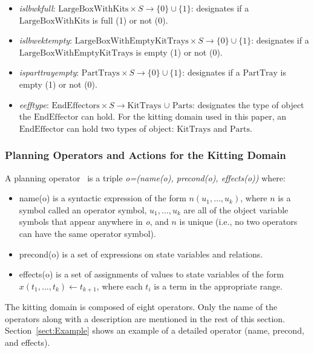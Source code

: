 \documentclass[a4paper, 10pt, conference]{ieeeconf}      %
\begin{document}
\begin{itemize}
\item \emph{islbwkfull}: $\mathrm{LargeBoxWithKits}\times S\rightarrow \lbrace 0\rbrace \cup \lbrace 1\rbrace$: designates if a $\mathrm{LargeBoxWithKits}$ is full (1) or not (0).

\item \emph{islbwektempty}: $\mathrm{LargeBoxWithEmptyKitTrays}\times S\rightarrow \lbrace 0\rbrace \cup \lbrace 1\rbrace$: designates if a $\mathrm{LargeBoxWithEmptyKitTrays}$ is empty (1) or not (0).

\item \emph{isparttrayempty}: $\mathrm{PartTrays}\times S\rightarrow \lbrace 0\rbrace \cup \lbrace 1\rbrace$: designates if a $\mathrm{PartTray}$ is empty (1) or not (0).

\item \emph{eefftype}: $\mathrm{EndEffectors}\times S \rightarrow\mathrm{KitTrays}$ $\cup$ $\mathrm{Parts}$: designates the type of object the $\mathrm{EndEffector}$ can hold. For the kitting domain used in this paper, an $\mathrm{EndEffector}$ can hold two types of object: $\mathrm{KitTrays}$ and $\mathrm{Parts}$.
\end{itemize}

\subsubsection{Planning Operators and Actions for the Kitting Domain}

A planning operator~\cite{NAU.2004} is a triple \textit{o=(name(o), precond(o), effects(o))}
where:
\begin{itemize}
\item name(o) is a syntactic expression of the form $n(u_1,\dots,u_k)$, where $n$ is a symbol
called an operator symbol, $u_1,\dots,u_k$ are all of the object variable symbols that
appear anywhere in \textit{o}, and $n$ is unique (i.e., no two operators can have the
same operator symbol).
\item precond(o) is a set of expressions on state variables and relations.
\item effects(o) is a set of assignments of values to state variables of the form
$x(t_1,\dots,t_k)\leftarrow t_{k+1}$, where each $t_i$ is a term in the appropriate range.
\end{itemize}

The kitting domain is composed of eight operators. Only the name of the operators along with a description are mentioned in the rest of this section. Section~\ref{sect:Example} shows an example of a detailed operator (name, precond, and effects).
\end{document}
